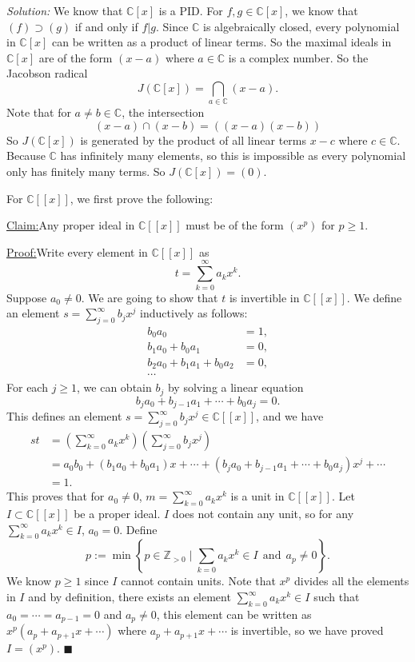 \documentclass[a4paper, 12pt]{article}
\newenvironment{solution}
    {\textit{Solution:}}
    {}
\newenvironment{claim}[1]{\par\noindent\underline{Claim:}\space#1}{}
\newenvironment{claimproof}[1]{\par\noindent\underline{Proof:}\space#1}{\hfill $\blacksquare$}
\begin{document}
\begin{solution}
We know that \(\mathbb{C}[x]\) is a PID. For \(f,g\in \mathbb{C}[x]\), we know that \((f)\supset (g)\) if and only if \(f|g\). Since \(\mathbb{C}\) is 
algebraically closed, every polynomial in \(\mathbb{C}[x]\) can be written as a product of linear terms. So the maximal ideals in \(\mathbb{C}[x]\) are of the form 
\((x-a)\) where \(a\in \mathbb{C}\) is a complex number. So the Jacobson radical 
\[J(\mathbb{C}[x])=\bigcap_{a\in \mathbb{C}} (x-a).\]
Note that for \(a\neq b\in \mathbb{C}\), the intersection 
\[(x-a)\cap(x-b)=((x-a)(x-b))\]
So \(J(\mathbb{C}[x])\) is generated by the product of all linear terms \(x-c\) where \(c\in \mathbb{C}\). Because \(\mathbb{C}\) has infinitely many elements, so this is impossible as every polynomial only has finitely many terms. So \(J(\mathbb{C}[x])=(0)\).

For \(\mathbb{C}[[x]]\), we first prove the following:
\begin{claim}
Any proper ideal in \(\mathbb{C}[[x]]\) must be of the form \((x^p)\) for \(p\geq 1\).
\end{claim}
\begin{claimproof}
Write every element in \(\mathbb{C}[[x]]\) as 
\[t=\sum_{k=0}^\infty a_k x^k. \]
Suppose \(a_0\neq 0\). We are going to show that \(t\) is invertible in \(\mathbb{C}[[x]]\). We define an element \(s=\sum_{j=0}^\infty b_jx^j\) inductively as follows: 
\begin{align*}
    b_0a_0&=1,\\
    b_1a_0+b_0a_1&=0,\\ 
    b_2a_0+b_1a_1+b_0a_2&=0,\\ 
    \cdots
\end{align*}
For each \(j\geq 1\), we can obtain \(b_j\) by solving a linear equation 
\[b_ja_0+b_{j-1}a_1+\cdots+b_0a_j=0.\]
This defines an element \(s=\sum_{j=0}^\infty b_jx^j\in \mathbb{C}[[x]]\), and we have 
\begin{align*}
    st&=(\sum_{k=0}^\infty a_kx^k)(\sum_{j=0}^\infty b_jx^j)\\ 
      &=a_0b_0+(b_1a_0+b_0a_1)x+\cdots+(b_ja_0+b_{j-1}a_1+\cdots+b_0a_j)x^j+\cdots\\ 
      &=1.
\end{align*}
This proves that for \(a_0\neq 0\), \(m=\sum_{k=0}^\infty a_kx^k\) is a unit in \(\mathbb{C}[[x]]\). Let \(I\subset \mathbb{C}[[x]]\) be a proper ideal. \(I\) does not contain any unit, so for 
any \(\sum_{k=0}^\infty a_kx^k\in I\), \(a_0=0\). Define 
\[p:=\min \left\{ p \in \mathbb{Z}_{>0}\mid \sum_{k=0}a_kx^k\in I\ \ \text{and}\ \ a_p\neq 0\right\}.\]
We know \(p\geq 1\) since \(I\) cannot contain units. Note that \(x^p\) divides all the elements in \(I\) and by definition, there exists an element \(\sum_{k=0}^\infty a_kx^k\in I\) such that \(a_0=\cdots=a_{p-1}=0\) and \(a_p\neq 0\), this element 
can be written as \(x^p(a_p+a_{p+1}x+\cdots)\) where \(a_p+a_{p+1}x+\cdots\) is invertible, so we have proved \(I=(x^p)\). 
\end{claimproof}


\end{solution}
\end{document}
